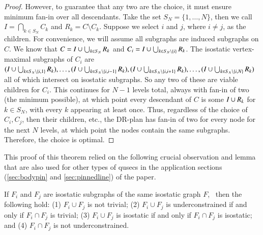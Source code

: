 \begin{proof}
However, to guarantee that any two are the  choice, it must ensure minimum fan-in over all descendants. Take the set $S_N=\{1,\dots,N\}$, then we call $I=\bigcap_{k\in S_N}{C_k}$ and $R_k=C\setminus C_k$. Suppose we select $i$ and $j$, where $i\neq j$, as the children. For convenience, we will assume all subgraphs are induced subgraphs on $C$. We know that $C=I\cup\bigcup_{k\in S_N}{R_k}$ and $C_i=I\cup\bigcup_{k\in S_N\setminus\{i\}}{R_k}$. The isostatic vertex-maximal subgraphs of $C_i$ are $(I\cup\bigcup_{k\in S_N\setminus\{i,1\}}{R_k}),\ldots,(I\cup\bigcup_{k\in S_N\setminus\{i,i-1\}}{R_k}),(I\cup\bigcup_{k\in S_N\setminus\{i,i+1\}}{R_k}),\ldots,(I\cup\bigcup_{k\in S_N\setminus\{i,N\}}{R_k})$ all of which intersect on isostatic subgraphs. So any two of these are viable children for $C_i$.
This continues for $N-1$ levels total, always with fan-in of two (the minimum possible), at which point every descendant of $C$ is some $I\cup R_k$ for $k\in S_N$, with every $k$ appearing at least once. Thus, regardless of the choice of $C_i,C_j$, then their children, etc., the DR-plan has fan-in of two for every node for the next $N$ levels, at which point the nodes contain the same subgraphs. Therefore, the choice is optimal.
%
%
\end{proof}

This proof of this theorem relied on the following crucial observation and lemma that are also used for other types of qusecs in the application sections (\ref{sec:bodypin} and \ref{sec:pinnedline}) of the paper.

\begin{observation*}\label{lemma:union_intersection}
If $F_i$ and $F_j$ are isostatic subgraphs of the same
isostatic graph $F$, \
then the following hold:
(1) $F_i\cup F_j$ is not trivial;
(2) $F_i\cup F_j$ is underconstrained if and only if $F_i\cap F_j$ is trivial;
(3) $F_i\cup F_j$ is isostatic if and only if $F_i\cap F_j$ is isostatic; and
(4) $F_i\cap F_j$ is not underconstrained.
\end{observation*}

